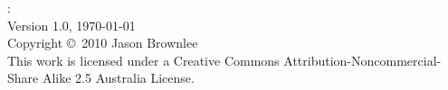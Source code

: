 


\begin{flushleft}
%
\mybooktitle: \mybooksubtitle \\
Version 1.0, \today \\
Copyright \copyright\ 2010 Jason Brownlee \\
This work is licensed under a Creative Commons Attribution-Noncommercial-Share Alike 2.5 Australia License.
%
\end{flushleft}

\hfill


	
\vfill\vfill\vfill